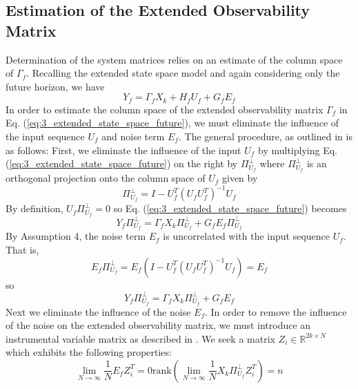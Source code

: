 \subsection{Estimation of the Extended Observability Matrix}\label{sec:estimation_of_the_extended_observability_matrix}
Determination of the system matrices relies on an estimate of the column space of $\Gamma_f$. Recalling the extended state space model and again considering only the future horizon, we have
\begin{equation}\label{eq:3_extended_state_space_future}
Y_f = \Gamma_f X_k + H_f U_f + G_f E_f
\end{equation}
In order to estimate the column space of the extended observability matrix $\Gamma_f$ in Eq. (\ref{eq:3_extended_state_space_future}), we must eliminate the influence of the input sequence $U_f$ and noise term $E_f$. The general procedure, as outlined in \cite{qin2006overview, verhaegen2007filtering} is as follows: First, we eliminate the influence of the input $U_f$ by multiplying Eq. (\ref{eq:3_extended_state_space_future}) on the right by $\Pi_{U_f}^\perp$ where $\Pi_{U_f}^\perp$ is an orthogonal projection onto the column space of $U_f$ given by
\begin{equation*}
\Pi_{U_f}^\perp = I - U_f^T(U_f U_f^T)^{-1}U_f
\end{equation*}
By definition, $U_f\Pi_{U_f}^\perp = 0$ so Eq. (\ref{eq:3_extended_state_space_future}) becomes
\begin{equation}
Y_f\Pi_{U_f}^\perp = \Gamma_f X_k\Pi_{U_f}^\perp + G_f E_f\Pi_{U_f}^\perp
\end{equation}
By Assumption 4, the noise term $E_f$ is uncorrelated with the input sequence $U_f$. That is,
\begin{equation*}
E_f \Pi_{U_f}^\perp = E_f(I-U_f^T(U_fU_f^T)^{-1}U_f) = E_f
\end{equation*}
so
\begin{equation}\label{eq:3_extended_state_space_noinput}
Y_f\Pi_{U_f}^\perp = \Gamma_f X_k\Pi_{U_f}^\perp + G_f E_f
\end{equation}
Next we eliminate the influence of the noise $E_f$. In order to remove the influence of the noise on the extended observability matrix, we must introduce an instrumental variable matrix as described in \cite{verhaegen2007filtering}. We seek a matrix $Z_i \in \mathbb{R}^{2k\times N}$ which exhibits the following properties:
\begin{subequations}\begin{equation}\label{eq:3_instrumental_a}
\lim_{N\rightarrow\infty} \frac{1}{N} E_f Z_i^T = 0
\end{equation}
\begin{equation}\label{eq:3_instrumental_b}
\mbox{rank}\left(\lim_{N\rightarrow\infty} \frac{1}{N} X_k \Pi_{U_f}^\perp Z_i^T\right) = n
\end{equation}
\end{subequations}
